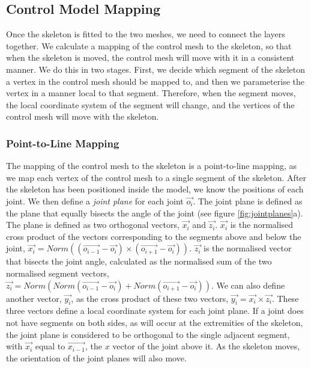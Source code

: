 \documentclass[10pt,oneside,fleqn,a4paper]{book}
\begin{document}
\subsection{\label{sec:chaincontrol}Control Model Mapping}
Once the skeleton is fitted to the two meshes, we need to connect the layers together. We calculate a mapping of the control mesh to the skeleton, so that when the skeleton is moved, the control mesh will move with it in a consistent manner. We do this in two stages. First, we decide which segment of the skeleton a vertex in the control mesh should be mapped to, and then we parameterise the vertex in a manner local to that segment. Therefore, when the segment moves, the local coordinate system of the segment will change, and the vertices of the control mesh will move with the skeleton.

\subsubsection{Point-to-Line Mapping}
The mapping of the control mesh to the skeleton is a point-to-line mapping, as we map each vertex of the control mesh to a single segment of the skeleton. After the skeleton has been positioned inside the model, we know the positions of each joint. We then define a {\it joint plane} for each joint $\vec{o_i}$. The joint plane is defined as the plane that equally bisects the angle of the joint (see figure \ref{fig:jointplanes}a). The plane is defined as two orthogonal vectors, $\vec{x_i}$ and $\vec{z_i}$. $\vec{x_i}$ is the normalised cross product of the vectors corresponding to the segments above and below the joint, $\vec{x_i} = Norm((\vec{o_{i-1}} - \vec{o_i}) \times (\vec{o_{i+1}} - \vec{o_i}))$. $\vec{z_i}$ is the normalised vector that bisects the joint angle, calculated as the normalised sum of the two normalised segment vectors, $\vec{z_i} = Norm(Norm(\vec{o_{i-1}} - \vec{o_i}) + Norm(\vec{o_{i+1}} - \vec{o_i}))$. We can also define another vector, $\vec{y_i}$, as the cross product of these two vectors, $\vec{y_i} = \vec{x_i} \times \vec{z_i}$. These three vectors define a local coordinate system for each joint plane. If a joint does not have segments on both sides, as will occur at the extremities of the skeleton, the joint plane is considered to be orthogonal to the single adjacent segment, with $\vec{x_i}$ equal to $\vec{x_{i-1}}$, the $x$ vector of the joint above it. As the skeleton moves, the orientation of the joint planes will also move.
\end{document}
